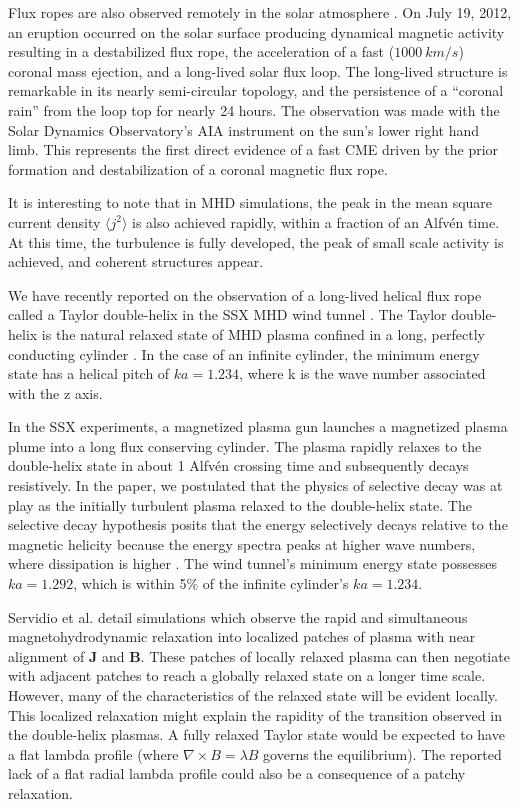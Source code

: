 \documentclass[12pt]{iopart}
\begin{document}
Flux ropes are also observed remotely in the solar atmosphere \cite{Patsourakos13}.  On July 19, 2012, an eruption occurred on the solar surface producing dynamical magnetic activity resulting in a destabilized flux rope, the acceleration of a fast ($1000~km/s$) coronal mass ejection, and a long-lived solar flux loop.  The long-lived structure is remarkable in its nearly semi-circular topology, and the persistence of a ``coronal rain'' from the loop top for nearly 24 hours.  The observation was made with the Solar Dynamics Observatory's AIA instrument on the sun's lower right hand limb.   This represents the first direct evidence of a fast CME driven by the prior formation and destabilization of a coronal magnetic flux rope.


It is interesting to note that in MHD simulations, the peak in the mean square current density $\langle j^2 \rangle$ is also achieved rapidly, within a fraction of an Alfv\'en time. At this time, the turbulence is fully developed, the peak of small scale activity is achieved, and coherent structures appear. 

We have recently reported on the observation of a long-lived helical flux rope called a Taylor double-helix in the SSX MHD wind tunnel \cite{Gray13}.  The Taylor double-helix is the natural relaxed state of MHD plasma confined in a long, perfectly conducting cylinder \cite{Taylor86}.  In the case of an infinite cylinder, the minimum energy state has a helical pitch of $ ka = 1.234$, where k is the wave number associated with the z axis.  

In the SSX experiments, a magnetized plasma gun launches a magnetized plasma plume into a long flux conserving cylinder.  The plasma rapidly relaxes to the double-helix state in about 1 Alfv\'en crossing time and subsequently decays resistively.  In the paper, we postulated that the physics of selective decay was at play as the initially turbulent plasma relaxed to the double-helix state.  The selective decay hypothesis posits that the energy selectively decays relative to the magnetic helicity because the energy spectra peaks at higher wave numbers, where dissipation is higher \cite{Matthaeus80}.  The wind tunnel's minimum energy state possesses $ka = 1.292$, which is within 5\% of the infinite cylinder's $ka = 1.234$. 

Servidio et al. \cite{Servidio08,Servidio11} detail simulations which observe the rapid and simultaneous magnetohydrodynamic relaxation into localized patches of plasma with near alignment of {\bf J} and {\bf B}. These patches of locally relaxed plasma can then negotiate with adjacent patches to reach a globally relaxed state on a longer time scale.  However, many of the characteristics of the relaxed state will be evident locally. This localized relaxation might explain the rapidity of the transition observed in the double-helix plasmas.  A fully relaxed Taylor state would be expected to have a flat lambda profile (where $\nabla \times B = \lambda B$ governs the equilibrium).  The reported lack of a flat radial lambda profile could also be a consequence of a patchy relaxation.
\end{document}
